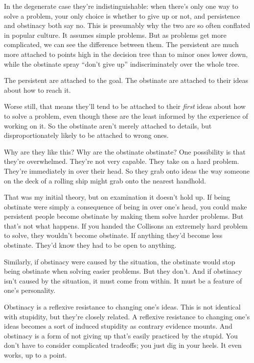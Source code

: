 In the degenerate case they're indistinguishable: when there's only one
way to solve a problem, your only choice is whether to give up or not,
and persistence and obstinacy both say no. This is presumably why the
two are so often conflated in popular culture. It assumes simple
problems. But as problems get more complicated, we can see the
difference between them. The persistent are much more attached to points
high in the decision tree than to minor ones lower down, while the
obstinate spray ``don't give up'' indiscriminately over the whole tree.

The persistent are attached to the goal. The obstinate are attached to
their ideas about how to reach it.

Worse still, that means they'll tend to be attached to their
\emph{first} ideas about how to solve a problem, even though these are
the least informed by the experience of working on it. So the obstinate
aren't merely attached to details, but disproportionately likely to be
attached to wrong ones.

Why are they like this? Why are the obstinate obstinate? One possibility
is that they're overwhelmed. They're not very capable. They take on a
hard problem. They're immediately in over their head. So they grab onto
ideas the way someone on the deck of a rolling ship might grab onto the
nearest handhold.

That was my initial theory, but on examination it doesn't hold up. If
being obstinate were simply a consequence of being in over one's head,
you could make persistent people become obstinate by making them solve
harder problems. But that's not what happens. If you handed the
Collisons an extremely hard problem to solve, they wouldn't become
obstinate. If anything they'd become less obstinate. They'd know they
had to be open to anything.

Similarly, if obstinacy were caused by the situation, the obstinate
would stop being obstinate when solving easier problems. But they don't.
And if obstinacy isn't caused by the situation, it must come from
within. It must be a feature of one's personality.

Obstinacy is a reflexive resistance to changing one's ideas. This is not
identical with stupidity, but they're closely related. A reflexive
resistance to changing one's ideas becomes a sort of induced stupidity
as contrary evidence mounts. And obstinacy is a form of not giving up
that's easily practiced by the stupid. You don't have to consider
complicated tradeoffs; you just dig in your heels. It even works, up to
a point.


